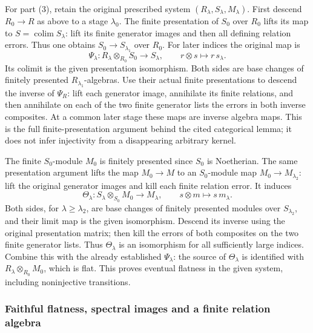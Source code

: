 For part (3), retain the original prescribed system \((R_\lambda,S_\lambda,M_\lambda)\). First descend \(R_0\to R\) as above to a stage \(\lambda_0\). The finite presentation of \(S_0\) over \(R_0\) lifts its map to \(S=\operatorname{colim}S_\lambda\): lift its finite generator images and then all defining relation errors. Thus one obtains \(S_0\to S_{\lambda_1}\) over \(R_0\). For later indices the original map is \[
 \Psi_\lambda:R_\lambda\otimes_{R_0}S_0\longrightarrow S_\lambda,
 \qquad r\otimes s\longmapsto r\,s_\lambda.
\] Its colimit is the given presentation isomorphism. Both sides are base changes of finitely presented \(R_{\lambda_1}\)-algebras. Use their actual finite presentations to descend the inverse of \(\Psi_R\): lift each generator image, annihilate its finite relations, and then annihilate on each of the two finite generator lists the errors in both inverse composites. At a common later stage these maps are inverse algebra maps. This is the full finite-presentation argument behind the cited categorical lemma; it does not infer injectivity from a disappearing arbitrary kernel.

The finite \(S_0\)-module \(M_0\) is finitely presented since \(S_0\) is Noetherian. The same presentation argument lifts the map \(M_0\to M\) to an \(S_0\)-module map \(M_0\to M_{\lambda_2}\): lift the original generator images and kill each finite relation error. It induces \[
 \Theta_\lambda:S_\lambda\otimes_{S_0}M_0\longrightarrow M_\lambda,
 \qquad s\otimes m\longmapsto s\,m_\lambda.
\] Both sides, for \(\lambda\ge\lambda_2\), are base changes of finitely presented modules over \(S_{\lambda_2}\), and their limit map is the given isomorphism. Descend its inverse using the original presentation matrix; then kill the errors of both composites on the two finite generator lists. Thus \(\Theta_\lambda\) is an isomorphism for all sufficiently large indices. Combine this with the already established \(\Psi_\lambda\): the source of \(\Theta_\lambda\) is identified with \(R_\lambda\otimes_{R_0}M_0\), which is flat. This proves eventual flatness in the given system, including noninjective transitions.

\subsubsection{Faithful flatness, spectral images and a finite relation algebra}\label{faithful-flatness-spectral-images-and-a-finite-relation-algebra}

